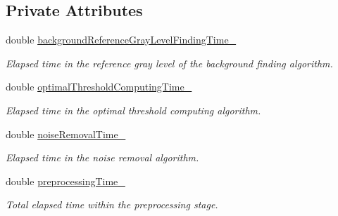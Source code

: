 \subsection*{Private Attributes}
\begin{CompactItemize}
\item 
\hypertarget{class_statistics_ac1d32288eac323391e66b2ff1a878e8}{
double \hyperlink{class_statistics_ac1d32288eac323391e66b2ff1a878e8}{backgroundReferenceGrayLevelFindingTime\_\-}}
\label{class_statistics_ac1d32288eac323391e66b2ff1a878e8}

\begin{CompactList}\small\item\em Elapsed time in the reference gray level of the background finding algorithm. \item\end{CompactList}\item 
\hypertarget{class_statistics_b8cb0f26533cee29b94f3a556b00e943}{
double \hyperlink{class_statistics_b8cb0f26533cee29b94f3a556b00e943}{optimalThresholdComputingTime\_\-}}
\label{class_statistics_b8cb0f26533cee29b94f3a556b00e943}

\begin{CompactList}\small\item\em Elapsed time in the optimal threshold computing algorithm. \item\end{CompactList}\item 
\hypertarget{class_statistics_acacd5443d740dda6ddd83deb777ec4b}{
double \hyperlink{class_statistics_acacd5443d740dda6ddd83deb777ec4b}{noiseRemovalTime\_\-}}
\label{class_statistics_acacd5443d740dda6ddd83deb777ec4b}

\begin{CompactList}\small\item\em Elapsed time in the noise removal algorithm. \item\end{CompactList}\item 
\hypertarget{class_statistics_91e724d9ef7b96e1df3310c61234ebbd}{
double \hyperlink{class_statistics_91e724d9ef7b96e1df3310c61234ebbd}{preprocessingTime\_\-}}
\label{class_statistics_91e724d9ef7b96e1df3310c61234ebbd}

\begin{CompactList}\small\item\em Total elapsed time within the preprocessing stage. \item\end{CompactList}\end{CompactItemize}
